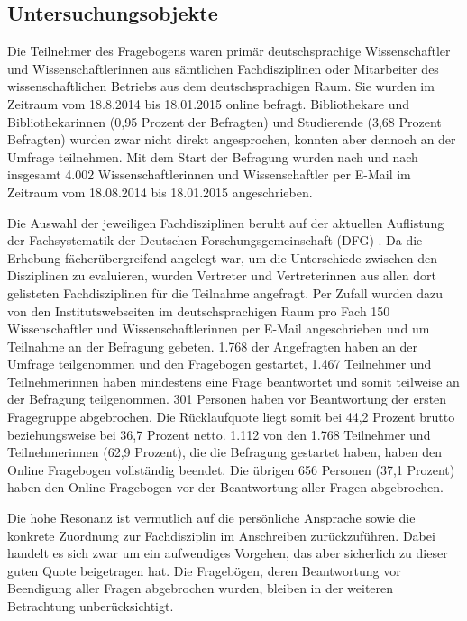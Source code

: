 \subsection{Untersuchungsobjekte}

Die Teilnehmer des Fragebogens waren primär deutschsprachige Wissenschaftler und Wissenschaftlerinnen aus sämtlichen Fachdisziplinen oder Mitarbeiter des wissenschaftlichen Betriebs aus dem deutschsprachigen Raum. Sie wurden im Zeitraum vom 18.8.2014 bis 18.01.2015 online befragt. Bibliothekare und Bibliothekarinnen (0,95 Prozent der Befragten) und Studierende (3,68 Prozent Befragten) wurden zwar nicht direkt angesprochen, konnten aber dennoch an der Umfrage teilnehmen. Mit dem Start der Befragung wurden nach und nach insgesamt 4.002 Wissenschaftlerinnen und Wissenschaftler per E-Mail im Zeitraum vom 18.08.2014 bis 18.01.2015 angeschrieben.

Die Auswahl der jeweiligen Fachdisziplinen beruht auf der aktuellen Auflistung der Fachsystematik der Deutschen Forschungsgemeinschaft (DFG) \cite{suchen_Webseite_DFG}. Da die Erhebung fächerübergreifend angelegt war, um die Unterschiede zwischen den Disziplinen zu evaluieren, wurden Vertreter und Vertreterinnen aus allen dort gelisteten Fachdisziplinen für die Teilnahme angefragt. Per Zufall wurden dazu von den Institutswebseiten im deutschsprachigen Raum pro Fach 150 Wissenschaftler und Wissenschaftlerinnen per E-Mail angeschrieben und um Teilnahme an der Befragung gebeten. 1.768 der Angefragten haben an der Umfrage teilgenommen und den Fragebogen gestartet, 1.467 Teilnehmer und Teilnehmerinnen haben mindestens eine Frage beantwortet und somit teilweise an der Befragung teilgenommen. 301 Personen haben vor Beantwortung der ersten Fragegruppe abgebrochen. Die Rücklaufquote liegt somit bei 44,2 Prozent brutto beziehungsweise bei 36,7 Prozent netto. 1.112 von den 1.768 Teilnehmer und Teilnehmerinnen (62,9 Prozent), die die Befragung gestartet haben, haben den Online Fragebogen vollständig beendet. Die übrigen 656 Personen (37,1 Prozent) haben den Online-Fragebogen vor der Beantwortung aller Fragen abgebrochen.

Die hohe Resonanz ist vermutlich auf die persönliche Ansprache sowie die konkrete Zuordnung zur Fachdisziplin im Anschreiben zurückzuführen. Dabei handelt es sich zwar um ein aufwendiges Vorgehen, das aber sicherlich zu dieser guten Quote beigetragen hat. Die Fragebögen, deren Beantwortung vor Beendigung aller Fragen abgebrochen wurden, bleiben in der weiteren Betrachtung unberücksichtigt.

